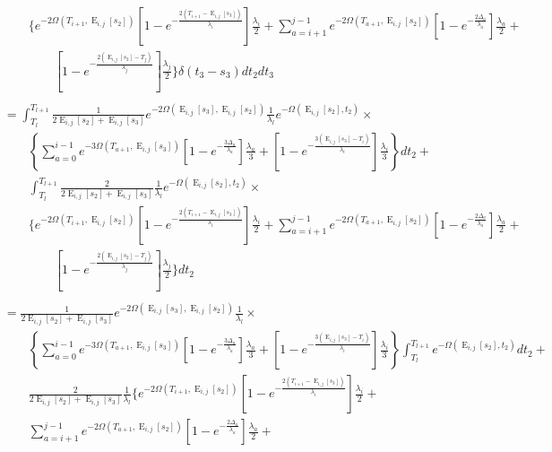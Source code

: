 \documentclass{article}
\DeclareMathOperator{\E}{E}
\begin{document}
\begin{align*}
    &\qquad\Bigg\{e^{-2\Omega(T_{i+1},\E_{i,j}[s_2])}\left[1-e^{-\frac{2\left(T_{i+1}-\E_{i,j}[s_3]\right)}{\lambda_i}}\right]\frac{\lambda_i}{2}+\sum_{a=i+1}^{j-1}e^{-2\Omega\left(T_{a+1},\E_{i,j}[s_2]\right)}\left[1-e^{-\frac{2\Delta_a}{\lambda_a}}\right]\frac{\lambda_a}{2}+\\
    &\qquad\qquad\left[1-e^{-\frac{2\left(\E_{i,j}[s_2]-T_j\right)}{\lambda_j}}\right]\frac{\lambda_j}{2}
    \Bigg\}\delta(t_3-s_3)dt_2dt_3\\
    \\
    &=\int_{T_l}^{T_{l+1}}\frac{1}{2\E_{i,j}[s_2]+\E_{i,j}[s_3]}e^{-2\Omega(\E_{i,j}[s_3],\E_{i,j}[s_2])}\frac{1}{\lambda_l}e^{-\Omega(\E_{i,j}[s_2],t_2)}\times\\
    &\qquad\left\{\sum_{a=0}^{i-1}e^{-3\Omega(T_{a+1},\E_{i,j}[s_3])}
        \left[1-e^{-\frac{3\Delta_a}{\lambda_a}}\right]\frac{\lambda_a}{3}+
    \left[1-e^{-\frac{3\left(\E_{i,j}[s_3]-T_i\right)}{\lambda_i}}\right]
    \frac{\lambda_i}{3}\right\}dt_2+\\
    &\qquad\int_{T_l}^{T_{l+1}}
        \frac{2}{2\E_{i,j}[s_2]+\E_{i,j}[s_3]}\frac{1}{\lambda_l}e^{-\Omega(\E_{i,j}[s_2],t_2)}\times\\
    &\qquad\Bigg\{e^{-2\Omega(T_{i+1},\E_{i,j}[s_2])}\left[1-e^{-\frac{2\left(T_{i+1}-\E_{i,j}[s_3]\right)}{\lambda_i}}\right]\frac{\lambda_i}{2}+\sum_{a=i+1}^{j-1}e^{-2\Omega\left(T_{a+1},\E_{i,j}[s_2]\right)}\left[1-e^{-\frac{2\Delta_a}{\lambda_a}}\right]\frac{\lambda_a}{2}+\\
    &\qquad\qquad\left[1-e^{-\frac{2\left(\E_{i,j}[s_2]-T_j\right)}{\lambda_j}}\right]\frac{\lambda_j}{2}
    \Bigg\}dt_2\\
    \\
    &=\frac{1}{2\E_{i,j}[s_2]+\E_{i,j}[s_3]}e^{-2\Omega(\E_{i,j}[s_3],\E_{i,j}[s_2])}\frac{1}{\lambda_l}\times\\
    &\qquad\left\{\sum_{a=0}^{i-1}e^{-3\Omega(T_{a+1},\E_{i,j}[s_3])}
        \left[1-e^{-\frac{3\Delta_a}{\lambda_a}}\right]\frac{\lambda_a}{3}+
    \left[1-e^{-\frac{3\left(\E_{i,j}[s_3]-T_i\right)}{\lambda_i}}\right]
    \frac{\lambda_i}{3}\right\}\int_{T_l}^{T_{l+1}}e^{-\Omega(\E_{i,j}[s_2],t_2)}dt_2+\\
    &\qquad
        \frac{2}{2\E_{i,j}[s_2]+\E_{i,j}[s_3]}\frac{1}{\lambda_l}\Bigg\{e^{-2\Omega(T_{i+1},\E_{i,j}[s_2])}\left[1-e^{-\frac{2\left(T_{i+1}-\E_{i,j}[s_3]\right)}{\lambda_i}}\right]\frac{\lambda_i}{2}+\\
    &\qquad\sum_{a=i+1}^{j-1}e^{-2\Omega\left(T_{a+1},\E_{i,j}[s_2]\right)}\left[1-e^{-\frac{2\Delta_a}{\lambda_a}}\right]\frac{\lambda_a}{2}+

\end{align*}
\end{document}
